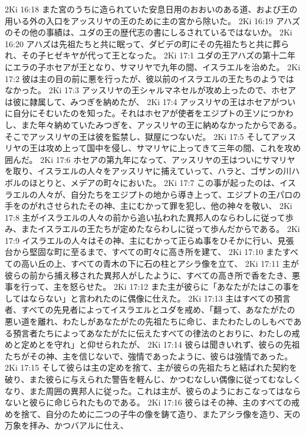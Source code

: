 2Ki 16:18  また宮のうちに造られていた安息日用のおおいのある道、および王の用いる外の入口をアッスリヤの王のために主の宮から除いた。
2Ki 16:19  アハズのその他の事績は、ユダの王の歴代志の書にしるされているではないか。
2Ki 16:20  アハズは先祖たちと共に眠って、ダビデの町にその先祖たちと共に葬られ、その子ヒゼキヤが代って王となった。
2Ki 17:1  ユダの王アハズの第十二年にエラの子ホセアが王となり、サマリヤで九年の間、イスラエルを治めた。
2Ki 17:2  彼は主の目の前に悪を行ったが、彼以前のイスラエルの王たちのようではなかった。
2Ki 17:3  アッスリヤの王シャルマネセルが攻め上ったので、ホセアは彼に隷属して、みつぎを納めたが、
2Ki 17:4  アッスリヤの王はホセアがついに自分にそむいたのを知った。それはホセアが使者をエジプトの王ソにつかわし、また年々納めていたみつぎを、アッスリヤの王に納めなかったからである。そこでアッスリヤの王は彼を監禁し、獄屋につないだ。
2Ki 17:5  そしてアッスリヤの王は攻め上って国中を侵し、サマリヤに上ってきて三年の間、これを攻め囲んだ。
2Ki 17:6  ホセアの第九年になって、アッスリヤの王はついにサマリヤを取り、イスラエルの人々をアッスリヤに捕えていって、ハラと、ゴザンの川ハボルのほとりと、メデアの町々においた。
2Ki 17:7  この事が起ったのは、イスラエルの人々が、自分たちをエジプトの地から導き上って、エジプトの王パロの手をのがれさせられたその神、主にむかって罪を犯し、他の神々を敬い、
2Ki 17:8  主がイスラエルの人々の前から追い払われた異邦人のならわしに従って歩み、またイスラエルの王たちが定めたならわしに従って歩んだからである。
2Ki 17:9  イスラエルの人々はその神、主にむかって正らぬ事をひそかに行い、見張台から堅固な町に至るまで、すべての町々に高き所を建て、
2Ki 17:10  またすべての高い丘の上、すべての青木の下に石の柱とアシラ像を立て、
2Ki 17:11  主が彼らの前から捕え移された異邦人がしたように、すべての高き所で香をたき、悪事を行って、主を怒らせた。
2Ki 17:12  また主が彼らに「あなたがたはこの事をしてはならない」と言われたのに偶像に仕えた。
2Ki 17:13  主はすべての預言者、すべての先見者によってイスラエルとユダを戒め、「翻って、あなたがたの悪い道を離れ、わたしがあなたがたの先祖たちに命じ、またわたしのしもべである預言者たちによってあなたがたに伝えたすべての律法のとおりに、わたしの戒めと定めとを守れ」と仰せられたが、
2Ki 17:14  彼らは聞きいれず、彼らの先祖たちがその神、主を信じないで、強情であったように、彼らは強情であった。
2Ki 17:15  そして彼らは主の定めを捨て、主が彼らの先祖たちと結ばれた契約を破り、また彼らに与えられた警告を軽んじ、かつむなしい偶像に従ってむなしくなり、また周囲の異邦人に従った。これは主が、彼らのようにおこなってはならないと彼らに命じられたものである。
2Ki 17:16  彼らはその神、主のすべての戒めを捨て、自分のために二つの子牛の像を鋳て造り、またアシラ像を造り、天の万象を拝み、かつバアルに仕え、
